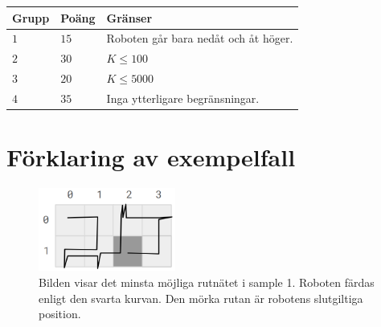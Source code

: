 \noindent
\begin{tabular}{| l | l | p{12cm} |}
  \hline
  \textbf{Grupp} & \textbf{Poäng} & \textbf{Gränser} \\ \hline
  $1$    & $15$       & Roboten går bara nedåt och åt höger. \\ \hline
  $2$    & $30$       & $K \leq 100$ \\ \hline
  $3$    & $20$       & $K \leq 5000$ \\ \hline
  $4$    & $35$       & Inga ytterligare begränsningar. \\ \hline
\end{tabular}

\section*{Förklaring av exempelfall}
\begin{centering}
  \begin{figure}[h]
      \centering
      \includegraphics[width=0.4\textwidth]{golvyta.PNG}
      \caption{Bilden visar det minsta möjliga rutnätet i sample 1. Roboten färdas enligt den svarta kurvan. Den mörka rutan är robotens slutgiltiga position.}
  \end{figure}
\end{centering}
